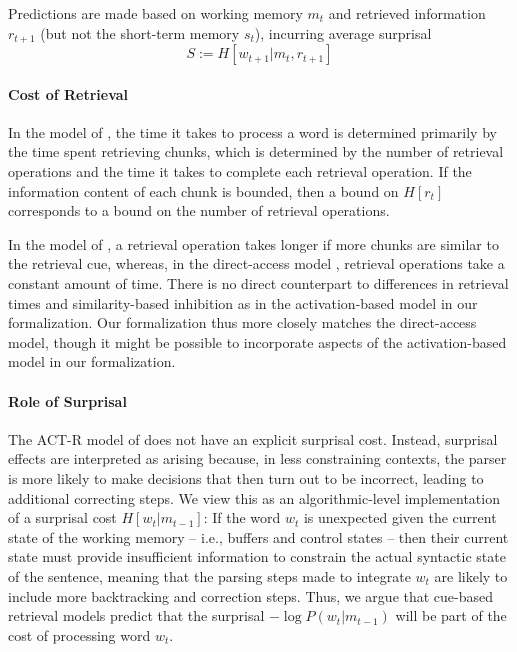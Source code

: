 \documentclass[11pt,letterpaper]{article}
\begin{document}
Predictions are made based on working memory $m_t$ and retrieved information $r_{t+1}$ (but not the short-term memory $s_t$), incurring average surprisal
\begin{equation}
    S := H[w_{t+1}|m_t, r_{t+1}]
\end{equation}


\paragraph{Cost of Retrieval}
In the model of \cite{lewis-activation-based-2005}, the time it takes to process a word is determined primarily by the time spent retrieving chunks, which is determined by the number of retrieval operations and the time it takes to complete each retrieval operation.
If the information content of each chunk is bounded, then a bound on $H[r_t]$ corresponds to a bound on the number of retrieval operations.

In the model of \cite{lewis-activation-based-2005}, a retrieval operation takes longer if more chunks are similar to the retrieval cue, whereas, in the direct-access model \citep{mcelree2000sentence,nicenboim2018models,vasishth2019computational}, retrieval operations take a constant amount of time.
There is no direct counterpart to differences in retrieval times and similarity-based inhibition as in the activation-based model in our formalization.
Our formalization thus more closely matches the direct-access model, though it might be possible to incorporate aspects of the activation-based model in our formalization.

\paragraph{Role of Surprisal}
The ACT-R model of \cite{lewis-activation-based-2005} does not have an explicit surprisal cost.
Instead, surprisal effects are interpreted as arising because, in less constraining contexts, the parser is more likely to make decisions that then turn out to be incorrect, leading to additional correcting steps.
We view this as an algorithmic-level implementation of a surprisal cost $H[w_t|m_{t-1}]$:
If the word $w_t$ is unexpected given the current state of the working memory -- i.e., buffers and control states -- then their current state must provide insufficient information to constrain the actual syntactic state of the sentence, meaning that the parsing steps made to integrate $w_t$ are likely to include more backtracking and correction steps.
Thus, we argue that cue-based retrieval models predict that the surprisal $- \log P(w_t|m_{t-1})$ will be part of the cost of processing word $w_t$.
\end{document}
